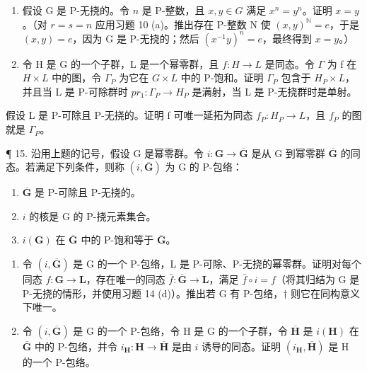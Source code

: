 \begin{enumerate}
\def\labelenumi{(\alph{enumi})}
\setcounter{enumi}{2}
\item
  假设 G 是 P-无挠的。令 \(n\) 是 P-整数，且 \(x, y \in G\) 满足 \(x^n = y^n\)。证明 \(x = y\)。（对 \(r = s = n\) 应用习题 10 (a)。推出存在 P-整数 N 使 \((x, y)^{\mathbb{N}} = e\)，于是 \((x, y) = e\)，因为 G 是 P-无挠的；然后 \((x^{-1}y)^n = e\)，最终得到 \(x = y\)。）
\item
  令 H 是 G 的一个子群，L 是一个幂零群，且 \(f: H \to L\) 是同态。令 \(\Gamma\) 为 f 在 \(H \times L\) 中的图，令 \(\Gamma_{P}\) 为它在 \(G \times L\) 中的 P-饱和。证明 \(\Gamma_{P}\) 包含于 \(H_{P} \times L\)，并且当 L 是 P-可除群时 \(pr_{1}: \Gamma_{P} \to H_{P}\) 是满射，当 L 是 P-无挠群时是单射。
\end{enumerate}

假设 L 是 P-可除且 P-无挠的。证明 f 可唯一延拓为同态 \(f_{P}: H_{P} \to L\)，且 \(f_{P}\) 的图就是 \(\Gamma_{P}\)。

¶ 15. 沿用上题的记号，假设 G 是幂零群。令 \(i: \mathbf{G} \to \overline{\mathbf{G}}\) 是从 G 到幂零群 \(\overline{\mathbf{G}}\) 的同态。若满足下列条件，则称 \((i, \overline{\mathbf{G}})\) 为 G 的 P-包络：

\begin{enumerate}
\def\labelenumi{(\roman{enumi})}
\item
  \(\overline{\mathbf{G}}\) 是 P-可除且 P-无挠的。
\item
  \(i\) 的核是 G 的 P-挠元素集合。
\item
  \(i(\mathbf{G})\) 在 \(\overline{\mathbf{G}}\) 中的 P-饱和等于 \(\overline{\mathbf{G}}\)。
\end{enumerate}

\begin{enumerate}
\def\labelenumi{(\alph{enumi})}
\item
  令 \((i, \overline{\mathbf{G}})\) 是 G 的一个 P-包络，L 是 P-可除、P-无挠的幂零群。证明对每个同态 \(f\colon \mathbf{G} \to \mathbf{L}\)，存在唯一的同态 \(\bar{f}\colon \overline{\mathbf{G}} \to \mathbf{L}\)，满足 \(\bar{f} \circ i = f\)（将其归结为 G 是 P-无挠的情形，并使用习题 14 (d)）。推出若 G 有 P-包络，\(\dagger\) 则它在同构意义下唯一。
\item
  令 \((i, \overline{\mathbf{G}})\) 是 G 的一个 P-包络，令 H 是 G 的一个子群，令 \(\overline{\mathbf{H}}\) 是 \(i(\mathbf{H})\) 在 \(\overline{\mathbf{G}}\) 中的 P-包络，并令 \(i_{\mathbf{H}}: \mathbf{H} \to \overline{\mathbf{H}}\) 是由 \(i\) 诱导的同态。证明 \((i_{\mathbf{H}}, \overline{\mathbf{H}})\) 是 H 的一个 P-包络。
\end{enumerate}

